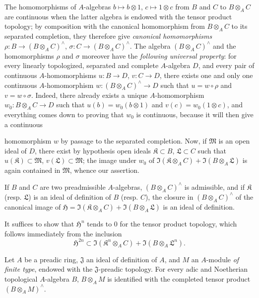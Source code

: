 \begin{env}[7.7.6]
\label{0.7.7.6}
The homomorphisms of $A$-algebras $b\mapsto b\otimes 1$,
$c\mapsto 1\otimes c$ from $B$ and $C$ to $B\otimes_A C$ are continuous
when the latter algebra is endowed with the tensor product topology;
by composition with the canonical homomorphism from $B\otimes_A C$ to its
separated completion, they therefore give \emph{canonical homomorphisms}
$\rho:B\to(B\otimes_A C)^\wedge$, $\sigma:C\to(B\otimes_A C)^\wedge$.
The algebra $(B\otimes_A C)^\wedge$ and the homomorphisms $\rho$ and $\sigma$
moreover have the \emph{following universal property}: for every
linearly topologized, separated and complete $A$-algebra $D$, and every
pair of continuous $A$-homomorphisms $u:B\to D$, $v:C\to D$, there exists one
and only one continuous $A$-homomorphism
$w:(B\otimes_A C)^\wedge\to D$ such that $u=w\circ\rho$ and
$v=w\circ\sigma$. Indeed, there already exists a unique $A$-homomorphism
$w_0:B\otimes_A C\to D$ such that $u(b)=w_0(b\otimes 1)$ and
$v(c)=w_0(1\otimes c)$, and everything comes down to proving that $w_0$ is continuous,
because it will then give a continuous


homomorphism $w$ by passage to the separated completion. Now, if
$\mathfrak M$ is an open ideal of $D$, there exist by hypothesis open
ideals $\mathfrak K\subset B$, $\mathfrak L\subset C$ such that
$u(\mathfrak K)\subset\mathfrak M$, $v(\mathfrak L)\subset\mathfrak M$;
the image under $w_0$ of
$\Im(\mathfrak K\otimes_A C)+\Im(B\otimes_A\mathfrak L)$ is again
contained in $\mathfrak M$, whence our assertion.
\end{env}

\begin{proposition}[7.7.7]
\label{0.7.7.7}
If $B$ and $C$ are two preadmissible $A$-algebras,
$(B\otimes_A C)^\wedge$ is admissible, and if $\mathfrak K$ (resp.
$\mathfrak L$) is an ideal of definition of $B$ (resp. $C$), the closure
in $(B\otimes_A C)^\wedge$ of the canonical image of
$\mathfrak H=\Im(\mathfrak K\otimes_A C)+\Im(B\otimes_A\mathfrak L)$ is
an ideal of definition.
\end{proposition}

It suffices to show that $\mathfrak H^n$ tends to $0$ for the tensor
product topology, which follows immediately from the inclusion
\[
  \mathfrak H^{2n}\subset
  \Im(\mathfrak K^n\otimes_A C)+\Im(B\otimes_A\mathfrak L^n).
\]

\begin{proposition}[7.7.8]
\label{0.7.7.8}
Let $A$ be a preadic ring, $\mathfrak J$ an ideal of definition of
$A$, and $M$ an $A$-module \emph{of finite type}, endowed with the
$\mathfrak J$-preadic topology. For every adic and Noetherian topological
$A$-algebra $B$, $B\otimes_A M$ is identified with the completed tensor product
$(B\otimes_A M)^\wedge$.
\end{proposition}

